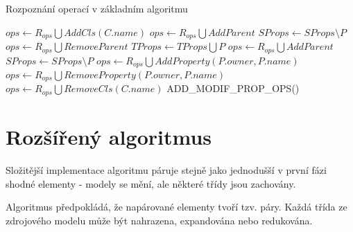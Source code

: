 \documentclass[11pt,twoside,a4paper]{book}
\begin{document}
\begin{algorithm}
 \caption{Rozpoznání operací v základním
 algoritmu}\label{algo:matching:ops_recognition}

\begin{algorithmic}[1]
   \Statex
   \State $ops \gets R_{ops} \bigcup AddCls(C.name)$
   \EndFor
   \Statex
    
         \State $ops \gets R_{ops} \bigcup AddParent$
            \State $SProps \gets SProps \setminus P$
         \EndFor
      \EndIf
   \EndFor
   \Statex
    
         \State $ops \gets R_{ops} \bigcup RemoveParent$
            \State $TProps \gets TProps \bigcup P$
         \EndFor
      \EndIf
   \EndFor
   \Statex
    
            \State $ops \gets R_{ops} \bigcup AddParent$
               \State $SProps \gets SProps \setminus P$
            \EndFor
         \EndIf
      \EndFor
   \EndFor
   \Statex
   \State $ops \gets R_{ops} \bigcup AddProperty(P.owner, P.name)$
   \EndFor
   \Statex
   \State $ops \gets R_{ops} \bigcup RemoveProperty(P.owner, P.name)$
   \EndFor
   \Statex
   \State $ops \gets R_{ops} \bigcup RemoveCls(C.name)$
   \EndFor   
   \Statex
   \State ADD\_MODIF\_PROP\_OPS()
   \EndProcedure
\end{algorithmic}
\end{algorithm}

\FloatBarrier
 
 \section{Rozšířený algoritmus}
 Složitější implementace algoritmu páruje stejně jako jednodušší v
 první fázi shodné elementy - modely se mění, ale některé třídy jsou zachovány.
 
 Algoritmus předpokládá, že napárované elementy tvoří tzv. páry. Každá třída ze
 zdrojového modelu může být nahrazena, expandována nebo redukována. \\
 
\end{document}
